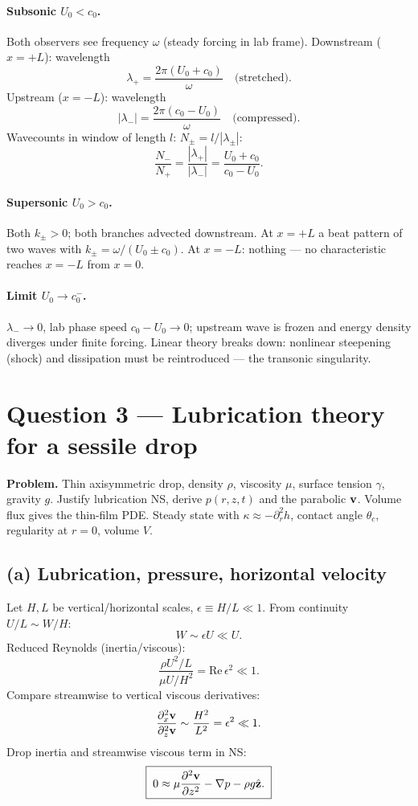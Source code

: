 \documentclass[11pt]{article}
\newcommand{\pdd}[2]{\frac{\partial^{2} #1}{\partial #2^{2}}}
\newcommand{\zhat}{\hat{\mathbf{z}}}
\begin{document}
\paragraph{Subsonic $U_0<c_0$.} Both observers see frequency $\omega$ (steady forcing in lab frame). Downstream ($x=+L$): wavelength
\[ \lambda_+ = \frac{2\pi(U_0+c_0)}{\omega}\quad\text{(stretched)}. \]
Upstream ($x=-L$): wavelength
\[ |\lambda_-| = \frac{2\pi(c_0-U_0)}{\omega}\quad\text{(compressed)}. \]
Wavecounts in window of length $l$: $N_\pm = l/|\lambda_\pm|$:
\[ \frac{N_-}{N_+} = \frac{|\lambda_+|}{|\lambda_-|} = \frac{U_0+c_0}{c_0-U_0}. \]

\paragraph{Supersonic $U_0>c_0$.} Both $k_\pm>0$; both branches advected downstream. At $x=+L$ a beat pattern of two waves with $k_\pm=\omega/(U_0\pm c_0)$. At $x=-L$: nothing — no characteristic reaches $x=-L$ from $x=0$.

\paragraph{Limit $U_0\to c_0^{-}$.} $\lambda_-\to 0$, lab phase speed $c_0-U_0\to 0$; upstream wave is frozen and energy density diverges under finite forcing. Linear theory breaks down: nonlinear steepening (shock) and dissipation must be reintroduced — the transonic singularity.

\section*{Question 3 --- Lubrication theory for a sessile drop}

\textbf{Problem.} Thin axisymmetric drop, density $\rho$, viscosity $\mu$, surface tension $\gamma$, gravity $g$. Justify lubrication NS, derive $p(r,z,t)$ and the parabolic $\vb v$. Volume flux gives the thin-film PDE. Steady state with $\kappa\approx-\partial_r^{2}h$, contact angle $\theta_c$, regularity at $r=0$, volume $V$.

\subsection*{(a) Lubrication, pressure, horizontal velocity}

Let $H,L$ be vertical/horizontal scales, $\epsilon\equiv H/L\ll 1$. From continuity $U/L\sim W/H$:
\[ W\sim\epsilon U\ll U. \]
Reduced Reynolds (inertia/viscous):
\[ \frac{\rho U^{2}/L}{\mu U/H^{2}} = \mathrm{Re}\,\epsilon^{2}\ll 1. \]
Compare streamwise to vertical viscous derivatives:
\[ \frac{\partial_x^{2}\vb v}{\partial_z^{2}\vb v} \sim \frac{H^{2}}{L^{2}} = \epsilon^{2}\ll 1. \]
Drop inertia and streamwise viscous term in NS:
\begin{equation}
\boxed{\;0\approx \mu\pdd{\vb v}{z} - \nabla p - \rho g\zhat.\;}
\label{eq:lub}
\end{equation}
\end{document}
